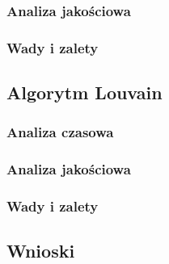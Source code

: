 \documentclass{article}
\begin{document}
\subsubsection{Analiza jakościowa}
\subsubsection{Wady i zalety}

\subsection{Algorytm Louvain}
\subsubsection{Analiza czasowa}
\subsubsection{Analiza jakościowa}
\subsubsection{Wady i zalety}

\subsection{Wnioski}

\newpage
\printbibliography
\end{document}
